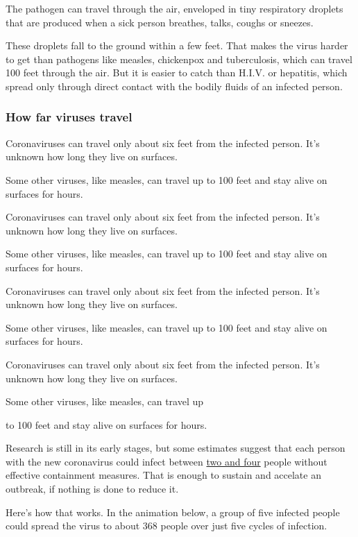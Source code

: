 The pathogen can travel through the air, enveloped in tiny respiratory
droplets that are produced when a sick person breathes, talks, coughs or
sneezes.

These droplets fall to the ground within a few feet. That makes the
virus harder to get than pathogens like measles, chickenpox and
tuberculosis, which can travel 100 feet through the air. But it is
easier to catch than H.I.V. or hepatitis, which spread only through
direct contact with the bodily fluids of an infected person.

\hypertarget{how-far-viruses-travel}{%
\subsubsection{How far viruses travel}\label{how-far-viruses-travel}}

Coronaviruses can travel only about six feet from the infected person.
It's unknown how long they live on surfaces.

Some other viruses, like measles, can travel up to 100 feet and stay
alive on surfaces for hours.

Coronaviruses can travel only about six feet from the infected person.
It's unknown how long they live on surfaces.

Some other viruses, like measles, can travel up to 100 feet and stay
alive on surfaces for hours.

Coronaviruses can travel only about six feet from the infected person.
It's unknown how long they live on surfaces.

Some other viruses, like measles, can travel up to 100 feet and stay
alive on surfaces for hours.

Coronaviruses can travel only about six feet from the infected person.
It's unknown how long they live on surfaces.

Some other viruses, like measles, can travel up

to 100 feet and stay alive on surfaces for hours.

Research is still in its early stages, but some estimates suggest that
each person with the new coronavirus could infect between
\href{https://academic.oup.com/jtm/advance-article/doi/10.1093/jtm/taaa021/5735319}{two
and four} people without effective containment measures. That is enough
to sustain and accelate an outbreak, if nothing is done to reduce it.

Here's how that works. In the animation below, a group of five infected
people could spread the virus to about 368 people over just five cycles
of infection.

